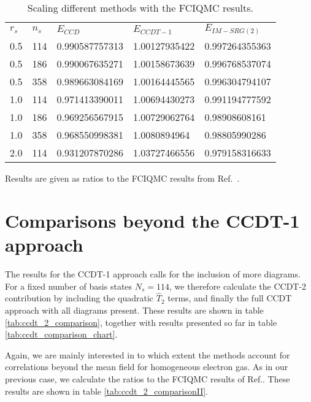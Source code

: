%




\begin{table}[hbtp]
\caption{Scaling different methods with the FCIQMC results.}
\begin{center}
\begin{threeparttable}
\begin{tabular}{l l l l l}
    \toprule
$r_s$ & $n_s$ & $E_{CCD}$  & $E_{CCDT-1}$ & $E_{IM-SRG(2)}$ \\
0.5 &114&0.990587757313 & 1.00127935422 & 0.997264355363 \\
0.5 &186& 0.990067635271 & 1.00158673639 & 0.996768537074 \\
0.5 &358& 0.989663084169 & 1.00164445565 & 0.996304794107 \\ \hline
1.0 &114& 0.971413390011 & 1.00694430273 & 0.991194777592 \\
1.0 &186& 0.969256567915 & 1.00729062764 & 0.98908608161 \\
1.0 &358& 0.968550998381 & 1.0080894964 & 0.98805990286 \\ \hline
2.0 &114 & 0.931207870286 & 1.03727466556 & 0.979158316633 \\
\bottomrule
\end{tabular}
\begin{tablenotes}
Results are given as ratios to the FCIQMC results from Ref.~\cite{Shepherd2012}. 
\end{tablenotes}
\end{threeparttable}
\end{center}
\label{tab:ccdt_comparison_chartII}
\end{table}

\FloatBarrier


\section{Comparisons beyond the CCDT-1 approach}

The results for the CCDT-1 approach calls for the inclusion of more diagrams. For a
fixed number of basis states $N_s = 114$, we therefore calculate the
CCDT-2 contribution by including the quadratic $\hat{T}_2$ terms, and finally the
full CCDT approach with all diagrams present. These results are shown in table
\ref{tab:ccdt_2_comparison}, together with results presented so far in
table \ref{tab:ccdt_comparison_chart}.

Again, we are mainly interested in to which extent the methods
account for correlations beyond the mean field for homogeneous electron gas. As in our previous case, we calculate the
ratios to the FCIQMC results of  Ref.\cite{Shepherd2012}. These results are
shown in table \ref{tab:ccdt_2_comparisonII}.

